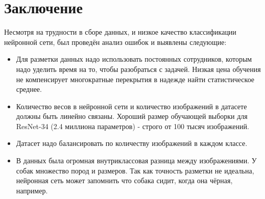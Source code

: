 \chapter*{Заключение}						%



Несмотря на трудности в сборе данных, и низкое качество классификации нейронной сети, был проведён анализ ошибок и выявлены следующие:
\begin{itemize}
    \item Для разметки данных надо использовать постоянных сотрудников, которым надо уделить время на то, чтобы разобраться с задачей. Низкая цена обучения не компенсирует многократные перекрытия в надежде найти статистическое среднее.
    \item Количество весов в нейронной сети и количество изображений в датасете должны быть линейно связаны. Хороший размер обучающей выборки для ResNet-34 (2.4 миллиона параметров) - строго от 100 тысяч изображений.
    \item Датасет надо балансировать по количеству изображений в каждом классе.
    \item В данных была огромная внутриклассовая разница между изображениями. У собак множество пород и размеров. Так как точность разметки не идеальна, нейронная сеть может запомнить что собака сидит, когда она чёрная, например. 
\end{itemize}{}
